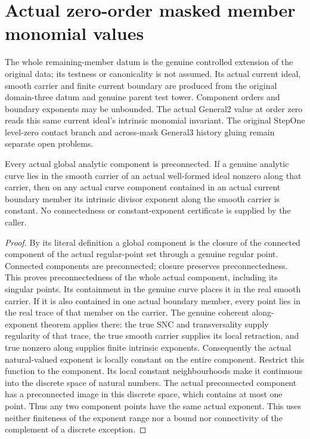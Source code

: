 \section{Actual zero-order masked member monomial values}

The whole remaining-member datum is the genuine controlled extension of the
original data; its testness or canonicality is not assumed. Its actual
current ideal, smooth carrier and finite current boundary are produced from
the original domain-three datum and genuine parent test tower. Component
orders and boundary exponents may be unbounded. The actual General2 value
at order zero reads this same current ideal's intrinsic monomial invariant.
The original StepOne level-zero contact branch and across-mask General3
history gluing remain separate open problems.

\begin{lemma}
\label{hir:member-monomial-component-exponent-constancy}
\leanok
Every actual global analytic component is preconnected. If a genuine analytic
curve lies in the smooth carrier of an actual well-formed ideal nonzero along
that carrier, then on any actual curve component contained in an actual
current boundary member its intrinsic divisor exponent along the smooth
carrier is constant. No connectedness or constant-exponent certificate is
supplied by the caller.
\end{lemma}
\begin{proof}
By its literal definition a global component is the closure of the connected
component of the actual regular-point set through a genuine regular point.
Connected components are preconnected; closure preserves preconnectedness.
This proves preconnectedness of the whole actual component, including its
singular points. Its containment in the genuine curve places it in the real
smooth carrier. If it is also contained in one actual boundary member, every
point lies in the real trace of that member on the carrier. The genuine
coherent along-exponent theorem applies there: the true SNC and transversality
supply regularity of that trace, the true smooth carrier supplies its local
retraction, and true nonzero along supplies finite intrinsic exponents.
Consequently the actual natural-valued exponent is locally constant on the
entire component. Restrict this function to the component. Its local constant
neighbourhoods make it continuous into the discrete space of natural numbers.
The actual preconnected component has a preconnected image in this discrete
space, which contains at most one point. Thus any two component points have
the same actual exponent. This uses neither finiteness of the exponent range
nor a bound nor connectivity of the complement of a discrete exception.
\end{proof}

